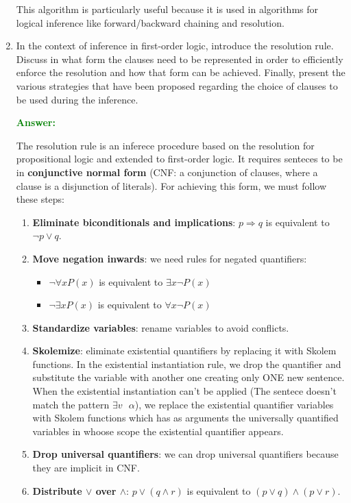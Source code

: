 \documentclass[12pt]{article}
\begin{document}
\begin{enumerate}[label=\textbf{FOL.\arabic*}]
    This algorithm is particularly useful because it is used in algorithms for logical inference like forward/backward chaining and resolution.


    \item In the context of inference in first-order logic, introduce the resolution rule.
    Discuss in what form the clauses need to be represented in order to efficiently enforce the resolution and how that form can be achieved.
    Finally, present the various strategies that have been proposed regarding the choice of clauses to be used during the inference.

    \textcolor{green}{\textbf{Answer:}}

    The resolution rule is an inferece procedure based on the resolution for propositional logic and extended to first-order logic.
    It requires senteces to  be in \textbf{conjunctive normal form} (CNF\@: a conjunction of clauses, where a clause is a disjunction of literals).
    For achieving this form, we must follow these steps:
    \begin{enumerate}
        \item \textbf{Eliminate biconditionals and implications}: $p\Rightarrow q$ is equivalent to $\lnot p\lor q$.
        \item \textbf{Move negation inwards}: we need rules for negated quantifiers:
        \begin{itemize}
            \item $\lnot\forall x P(x)$ is equivalent to $\exists x \lnot P(x)$
            \item $\lnot\exists x P(x)$ is equivalent to $\forall x \lnot P(x)$
        \end{itemize}
        \item \textbf{Standardize variables}: rename variables to avoid conflicts.
        \item \textbf{Skolemize}: eliminate existential quantifiers by replacing it with Skolem functions.
        In the existential instantiation rule, we drop the quantifier and substitute the variable with another one creating only ONE new sentence.
        When the existential instantiation can't be applied (The sentece doesn't match the pattern $\exists v\text{  }\alpha$), we replace 
        the existential quantifier variables with Skolem functions which has as arguments the universally quantified variables in whoose scope the existential quantifier appears.

        \item \textbf{Drop universal quantifiers}: we can drop universal quantifiers because they are implicit in CNF\@.
        \item \textbf{Distribute $\lor$ over $\land$}: $p\lor(q\land r)$ is equivalent to $(p\lor q)\land(p\lor r)$.
    \end{enumerate}


\end{enumerate}
\end{document}
